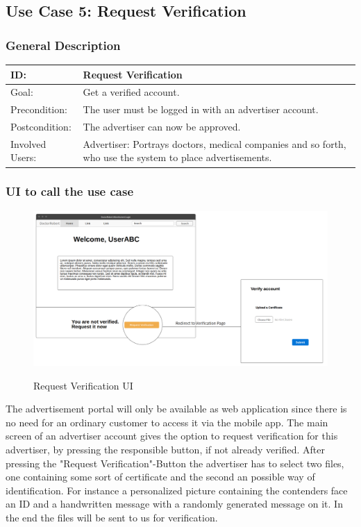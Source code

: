 \subsection{Use Case 5: Request Verification}

\subsubsection{General Description}
\begin{tabular}{|p{.2\linewidth}|p{.65\linewidth}|}
\hline 
ID: & Request Verification \\ \hline
Goal: & Get a verified account. \\ \hline
Precondition: & The user must be logged in with an advertiser account.  \\ \hline
Postcondition: & The advertiser can now be approved. \\ \hline
Involved Users: & Advertiser: Portrays doctors, medical companies and so forth, who use the system to place advertisements. \\ \hline
\end{tabular}

\subsubsection{UI to call the use case}
\begin{minipage}{1\textwidth}
\begin{figure}[H]
\includegraphics[scale=.65]{SystemSpec/Usecases/Mocks/reqVeri01.png}\\
\caption{\label{fig:blue_rectangle}Request Verification UI}
\end{figure}
\end{minipage} \hfill
\begin{minipage}{1\textwidth}
The advertisement portal will only be available as web application since there is no need for an ordinary customer to access it via the mobile app.
The main screen of an advertiser account gives the option to request verification for this advertiser, by pressing the responsible button, if not already verified. After pressing the "Request Verification"-Button the advertiser has to select two files, one containing some sort of certificate and the second an possible way of identification. For instance a personalized picture containing the contenders face an ID and a handwritten message with a randomly generated message on it.
In the end the files will be sent to us for verification.
\end{minipage}

